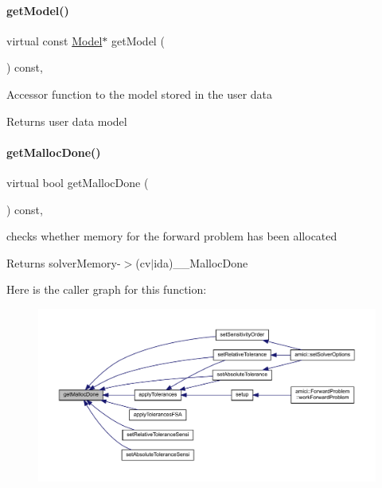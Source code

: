 \paragraph{\texorpdfstring{get\+Model()}{getModel()}}
{\footnotesize\ttfamily virtual const \mbox{\hyperlink{classamici_1_1_model}{Model}}$\ast$ get\+Model (\begin{DoxyParamCaption}{ }\end{DoxyParamCaption}) const\hspace{0.3cm}{\ttfamily [protected]}, {}}

Accessor function to the model stored in the user data

\begin{DoxyReturn}{Returns}
user data model 
\end{DoxyReturn}
\mbox{\label{classamici_1_1_solver_af4bbf9fea3348d86380be1c059e4b9f5}} 
\paragraph{\texorpdfstring{get\+Malloc\+Done()}{getMallocDone()}}
{\footnotesize\ttfamily virtual bool get\+Malloc\+Done (\begin{DoxyParamCaption}{ }\end{DoxyParamCaption}) const\hspace{0.3cm}{\ttfamily [protected]}, {}}

checks whether memory for the forward problem has been allocated

\begin{DoxyReturn}{Returns}
solver\+Memory-\/$>$(cv$\vert$ida)\+\_\+\+\_\+\+Malloc\+Done 
\end{DoxyReturn}
Here is the caller graph for this function\+:
\nopagebreak
\begin{figure}[H]
\begin{center}
\leavevmode
\includegraphics[width=350pt]{classamici_1_1_solver_af4bbf9fea3348d86380be1c059e4b9f5_icgraph}
\end{center}
\end{figure}
\mbox{\label{classamici_1_1_solver_a9673b3bc9248c4b7a156da9632b91436}} 

